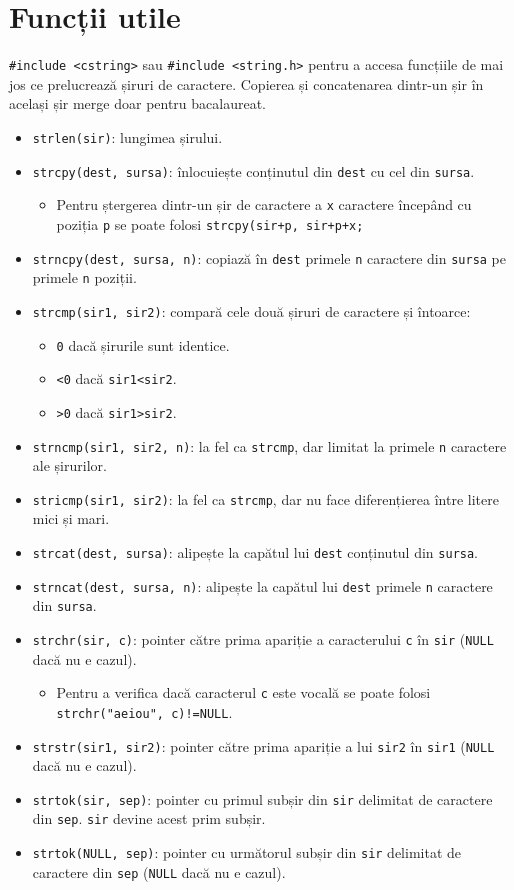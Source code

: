 \documentclass{article}
\begin{document}
\section*{Funcții utile}
\verb|#include <cstring>| sau \verb|#include <string.h>| pentru a accesa funcțiile de mai jos ce prelucrează șiruri de caractere. Copierea și concatenarea dintr-un șir în același șir merge doar pentru bacalaureat.
\begin{itemize}
    \item \verb|strlen(sir)|: lungimea șirului.
    \item \verb|strcpy(dest, sursa)|: înlocuiește conținutul din \verb|dest| cu cel din \verb|sursa|.
    \begin{itemize}
        \item Pentru ștergerea dintr-un șir de caractere a \verb|x| caractere începând cu poziția \verb|p| se poate folosi \verb|strcpy(sir+p, sir+p+x;|
    \end{itemize}
    \item \verb|strncpy(dest, sursa, n)|: copiază în \verb|dest| primele \verb|n| caractere din \verb|sursa| pe primele \verb|n| poziții.
    \item \verb|strcmp(sir1, sir2)|: compară cele două șiruri de caractere și întoarce:
    \begin{itemize}
        \item \verb|0| dacă șirurile sunt identice.
        \item \verb|<0| dacă \verb|sir1<sir2|.
        \item \verb|>0| dacă \verb|sir1>sir2|.
    \end{itemize}
    \item \verb|strncmp(sir1, sir2, n)|: la fel ca \verb|strcmp|, dar limitat la primele \verb|n| caractere ale șirurilor.
    \item \verb|stricmp(sir1, sir2)|: la fel ca \verb|strcmp|, dar nu face diferențierea între litere mici și mari.
    \item \verb|strcat(dest, sursa)|: alipește la capătul lui \verb|dest| conținutul din \verb|sursa|.
    \item \verb|strncat(dest, sursa, n)|: alipește la capătul lui \verb|dest| primele \verb|n| caractere din \verb|sursa|.
    \item \verb|strchr(sir, c)|: pointer către prima apariție a caracterului \verb|c| în \verb|sir| (\verb|NULL| dacă nu e cazul).
    \begin{itemize}
        \item Pentru a verifica dacă caracterul \verb|c| este vocală se poate folosi \verb|strchr("aeiou", c)!=NULL|.
    \end{itemize}
    \item \verb|strstr(sir1, sir2)|: pointer către prima apariție a lui \verb|sir2| în \verb|sir1| (\verb|NULL| dacă nu e cazul).
    \item \verb|strtok(sir, sep)|: pointer cu primul subșir din \verb|sir| delimitat de caractere din \verb|sep|. \verb|sir| devine acest prim subșir.
    \item \verb|strtok(NULL, sep)|: pointer cu următorul subșir din \verb|sir| delimitat de caractere din \verb|sep| (\verb|NULL| dacă nu e cazul).
\end{itemize}
\end{document}
